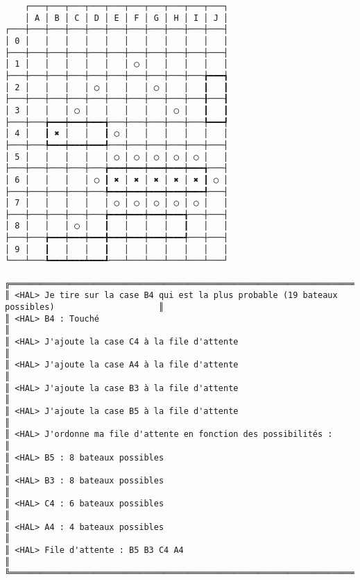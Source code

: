 {\scriptsize
\begin{verbatim}
    ┌───┬───┬───┬───┬───┬───┬───┬───┬───┬───┐
    │ A │ B │ C │ D │ E │ F │ G │ H │ I │ J │
┌───┼───┼───┼───┼───┼───┼───┼───┼───┼───┼───┤
│ 0 │   │   │   │   │   │   │   │   │   │   │
├───┼───┼───┼───┼───┼───┼───┼───┼───┼───┼───┤
│ 1 │   │   │   │   │   │ ◯ │   │   │   │   │
├───┼───┼───┼───┼───┼───┼───┼───┼───┼───╆━━━┪
│ 2 │   │   │   │ ◯ │   │   │ ◯ │   │   ┃   ┃
├───┼───┼───┼───┼───┼───┼───┼───┼───┼───╂───┨
│ 3 │   │   │ ◯ │   │   │   │   │ ◯ │   ┃   ┃
├───┼───╆━━━┿━━━┿━━━╅───┼───┼───┼───┼───╄━━━┩
│ 4 │   ┃ ✖ │   │   ┃ ◯ │   │   │   │   │   │
├───┼───╄━━━┿━━━┿━━━╃───┼───┼───┼───┼───┼───┤
│ 5 │   │   │   │   │ ◯ │ ◯ │ ◯ │ ◯ │ ◯ │   │
├───┼───┼───┼───┼───╆━━━┿━━━┿━━━┿━━━┿━━━╅───┤
│ 6 │   │   │   │ ◯ ┃ ✖ │ ✖ │ ✖ │ ✖ │ ✖ ┃ ◯ │
├───┼───┼───┼───┼───╄━━━┿━━━┿━━━┿━━━┿━━━╃───┤
│ 7 │   │   │   │   │ ◯ │ ◯ │ ◯ │ ◯ │ ◯ │   │
├───┼───┼───┼───┼───╆━━━┿━━━┿━━━┿━━━╅───┼───┤
│ 8 │   │   │ ◯ │   ┃   │   │   │   ┃   │   │
├───┼───╆━━━┿━━━┿━━━╋━━━┿━━━┿━━━┿━━━╃───┼───┤
│ 9 │   ┃   │   │   ┃   │   │   │   │   │   │
└───┴───┺━━━┷━━━┷━━━┹───┴───┴───┴───┴───┴───┘

╔══════════════════════════════════════════════════════════════════════════════════════════════════╗
║ <HAL> Je tire sur la case B4 qui est la plus probable (19 bateaux possibles)                     ║
║ <HAL> B4 : Touché                                                                                ║
║ <HAL> J'ajoute la case C4 à la file d'attente                                                    ║
║ <HAL> J'ajoute la case A4 à la file d'attente                                                    ║
║ <HAL> J'ajoute la case B3 à la file d'attente                                                    ║
║ <HAL> J'ajoute la case B5 à la file d'attente                                                    ║
║ <HAL> J'ordonne ma file d'attente en fonction des possibilités :                                 ║
║ <HAL> B5 : 8 bateaux possibles                                                                   ║
║ <HAL> B3 : 8 bateaux possibles                                                                   ║
║ <HAL> C4 : 6 bateaux possibles                                                                   ║
║ <HAL> A4 : 4 bateaux possibles                                                                   ║
║ <HAL> File d'attente : B5 B3 C4 A4                                                               ║
╚══════════════════════════════════════════════════════════════════════════════════════════════════╝
\end{verbatim}}
\newpage

